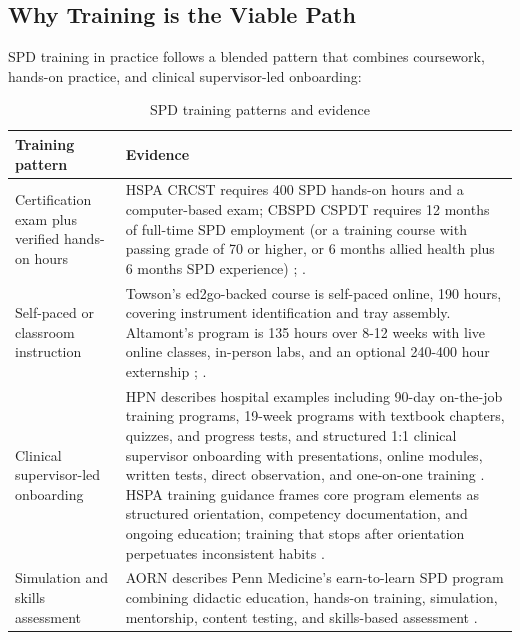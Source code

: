 \documentclass[10pt,a4paper]{article}
\begin{document}
\subsection{Why Training is the Viable Path}


SPD training in practice follows a blended pattern that combines coursework, hands-on practice, and clinical supervisor-led onboarding:
\begin{table}[H]
\centering
\caption{SPD training patterns and evidence}
\label{tab:spd-training-patterns-and-evidence}
\small\renewcommand{\arraystretch}{1.2}\setlength{\tabcolsep}{4pt}
\begin{tabularx}{\textwidth}{|>{\raggedright\arraybackslash}p{3cm}|>{\raggedright\arraybackslash}X|}
\hline
Training pattern & Evidence \\
\hline
Certification exam plus verified hands-on hours & HSPA CRCST requires 400 SPD hands-on hours and a computer-based exam; CBSPD CSPDT requires 12 months of full-time SPD employment (or a training course with passing grade of 70 or higher, or 6 months allied health plus 6 months SPD experience) \cite{hspa-crcst-accessed-2026}; \cite{cbspd-technician-accessed-2026}. \\
\hline
Self-paced or classroom instruction & Towson's ed2go-backed course is self-paced online, 190 hours, covering instrument identification and tray assembly. Altamont's program is 135 hours over 8-12 weeks with live online classes, in-person labs, and an optional 240-400 hour externship \cite{towson-sterile-processing-accessed-2026}; \cite{altamont-healthcare-accessed-2026}. \\
\hline
Clinical supervisor-led onboarding & HPN describes hospital examples including 90-day on-the-job training programs, 19-week programs with textbook chapters, quizzes, and progress tests, and structured 1:1 clinical supervisor onboarding with presentations, online modules, written tests, direct observation, and one-on-one training \cite{nadeau-2017}. HSPA training guidance frames core program elements as structured orientation, competency documentation, and ongoing education; training that stops after orientation perpetuates inconsistent habits \cite{klacik-2023}. \\
\hline
Simulation and skills assessment & AORN describes Penn Medicine's earn-to-learn SPD program combining didactic education, hands-on training, simulation, mentorship, content testing, and skills-based assessment \cite{aorn-staffing-shortage-2025}. \\
\hline
\end{tabularx}
\end{table}
\end{document}
